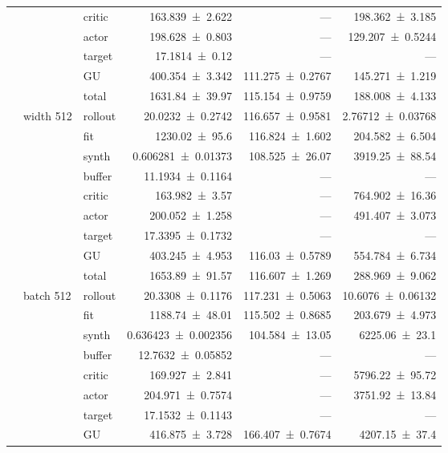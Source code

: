 {\begin{longtable}{@{}lllrrr@{}}
     &  & critic & \num{163.839+-2.622} & --- & \num{198.362+-3.185} \\
     &  & actor & \num{198.628+-0.803} & --- & \num{129.207+-0.5244} \\
     &  & target & \num{17.1814+-0.12} & --- & --- \\
     &  & GU & \num{400.354+-3.342} & \num{111.275+-0.2767} & \num{145.271+-1.219} \\
     &  & total & \num{1631.84+-39.97} & \num{115.154+-0.9759} & \num{188.008+-4.133} \\
    \addlinespace[2pt]
     & width 512 & rollout & \num{20.0232+-0.2742} & \num{116.657+-0.9581} & \num{2.76712+-0.03768} \\
     &  & fit & \num{1230.02+-95.6} & \num{116.824+-1.602} & \num{204.582+-6.504} \\
     &  & synth & \num{0.606281+-0.01373} & \num{108.525+-26.07} & \num{3919.25+-88.54} \\
     &  & buffer & \num{11.1934+-0.1164} & --- & --- \\
     &  & critic & \num{163.982+-3.57} & --- & \num{764.902+-16.36} \\
     &  & actor & \num{200.052+-1.258} & --- & \num{491.407+-3.073} \\
     &  & target & \num{17.3395+-0.1732} & --- & --- \\
     &  & GU & \num{403.245+-4.953} & \num{116.03+-0.5789} & \num{554.784+-6.734} \\
     &  & total & \num{1653.89+-91.57} & \num{116.607+-1.269} & \num{288.969+-9.062} \\
    \addlinespace[2pt]
     & batch 512 & rollout & \num{20.3308+-0.1176} & \num{117.231+-0.5063} & \num{10.6076+-0.06132} \\
     &  & fit & \num{1188.74+-48.01} & \num{115.502+-0.8685} & \num{203.679+-4.973} \\
     &  & synth & \num{0.636423+-0.002356} & \num{104.584+-13.05} & \num{6225.06+-23.1} \\
     &  & buffer & \num{12.7632+-0.05852} & --- & --- \\
     &  & critic & \num{169.927+-2.841} & --- & \num{5796.22+-95.72} \\
     &  & actor & \num{204.971+-0.7574} & --- & \num{3751.92+-13.84} \\
     &  & target & \num{17.1532+-0.1143} & --- & --- \\
     &  & GU & \num{416.875+-3.728} & \num{166.407+-0.7674} & \num{4207.15+-37.4} \\

\end{longtable}}
